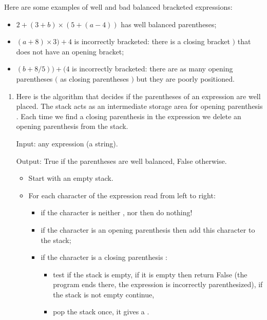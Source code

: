 \documentclass[11pt,class=report,crop=false]{standalone}
\begin{document}
\begin{activite}


Here are some examples of well and bad balanced bracketed expressions:
\begin{itemize}
  \item $2 + (3 + b) \times (5 + (a - 4))$ has well balanced parentheses;
  \item $(a+ 8) \times 3 ) + 4$ is incorrectly bracketed: there is a closing bracket \og{}$)$\fg{} that does not have an opening bracket;
  \item $(b + 8 / 5)) + (4$ is incorrectly bracketed: there are as many opening parentheses  \og{}$($\fg{} as closing parentheses \og{}$)$\fg{} but they are poorly positioned.
\end{itemize}

\begin{enumerate}
  \item 
 
  Here is the algorithm that decides if the parentheses of an expression are well placed. 
  The stack acts as an intermediate storage area for opening parenthesis . Each time we find a closing parenthesis  in the expression we delete an opening parenthesis from the stack.
  
  \begin{algorithme}
  Input: any expression (a string).
  
  Output: \og{}True\fg{} if the parentheses are well balanced, \og{}False\fg{} otherwise. 
  
  \begin{itemize}
   \item Start with an empty stack.   
   
   \item For each character of the expression read from left to right:
   \begin{itemize}
     \item if the character is neither , nor  then do nothing!
     
     \item if the character is an opening parenthesis  then add this character to the stack;
     
     \item if the character is a closing parenthesis :
       \begin{itemize}
         \item test if the stack is empty, if it is empty then return \og{}False\fg{} (the program ends there, the expression is incorrectly parenthesized), if the stack is not empty continue, 
         \item pop the stack once, it gives a .
       \end{itemize}
     \end{itemize} 
       

\end{itemize}
\end{algorithme}
\end{enumerate}
\end{activite}
\end{document}
